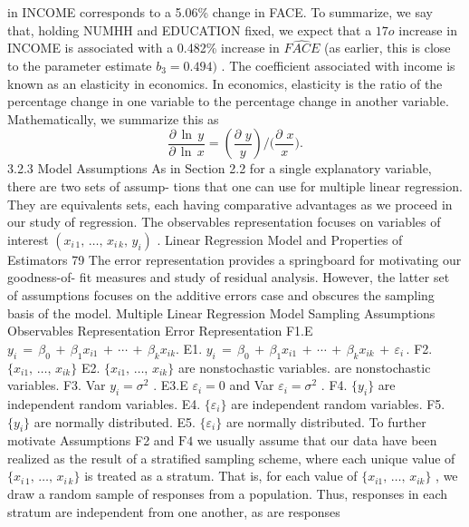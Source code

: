 \documentclass[11pt]{article}
\begin{document}
in INCOME corresponds to a 5.06\% change in FACE. To summarize, we say
that, holding NUMHH and EDUCATION fixed, we expect that a \(1 7 o\) increase in
INCOME is associated with a 0.482\% increase in \(\widehat{F A C E}\) (as earlier, this is close
 to the parameter estimate \(b_{3}=0 . 4 9 4 )\) . The coefficient associated with income is
known as an elasticity in economics. In economics, elasticity is the ratio of the
 percentage change in one variable to the percentage change in another variable.
Mathematically, we summarize this as
\[
\frac{\partial\, \operatorname{l n} \, y} {\partial\, \operatorname{l n} \, x}=\left( \frac{\partial\, \, y} {y} \right) \bigg/ \bigg( \frac{\partial\, \, x} {x} \bigg) .
\]
 3.2.3 Model Assumptions
As in Section 2.2 for a single explanatory variable, there are two sets of assump-
 tions that one can use for multiple linear regression. They are equivalents sets,
each having comparative advantages as we proceed in our study of regression.
 The observables representation focuses on variables of interest \(( x_{i \, 1} , \, \dots, \, x_{i \, k} , \, y_{i} )\) .
 Linear Regression Model and Properties of Estimators 79
 The error representation provides a springboard for motivating our goodness-of-
fit measures and study of residual analysis. However, the latter set of assumptions
 focuses on the additive errors case and obscures the sampling basis of the model.
 Multiple Linear Regression Model Sampling Assumptions
 Observables Representation Error Representation
F1.E \(y_{i} \,=\, \beta_{0} \,+\, \beta_{1} x_{i 1} \,+\, \cdots\,+\, \beta_{k} x_{i k} .\) E1. \(y_{i} \,=\, \beta_{0} \,+\, \beta_{1} x_{i 1} \,+\, \cdots\,+\, \beta_{k} x_{i k} \,+\, \varepsilon_{i} \, .\)
F2. \(\{x_{i 1} , \, \dots, \, x_{i k} \}\) E2. \(\{x_{i 1} , \, \dots, \, x_{i k} \}\)
 are nonstochastic variables. are nonstochastic variables.
F3. Var \(y_{i}=\sigma^{2}\) . E3.E \(\varepsilon_{i}=0\) and Var \(\varepsilon_{i}=\sigma^{2}\) .
F4. \(\{y_{i} \}\) are independent random variables. E4. \(\{\varepsilon_{i} \}\) are independent random variables.
F5. \(\{y_{i} \}\) are normally distributed. E5. \(\{\varepsilon_{i} \}\) are normally distributed.
 To further motivate Assumptions F2 and \(\mathrm{F 4}\) we usually assume that our data
have been realized as the result of a stratified sampling scheme, where each
 unique value of \(\{x_{i \, 1} , \, \dots, \, x_{i \, k} \}\) is treated as a stratum. That is, for each value of
\(\{x_{i 1} , \, \dots, \, x_{i k} \}\) , we draw a random sample of responses from a population. Thus,
responses in each stratum are independent from one another, as are responses
\end{document}
